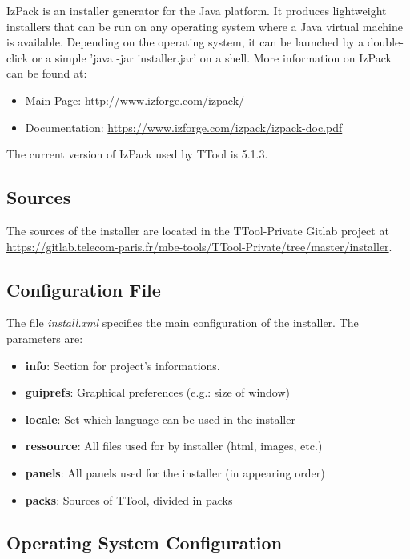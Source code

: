 \documentclass[12pt]{article}
\begin{document}
IzPack is an installer generator for the Java platform. It produces lightweight
installers that can be run on any operating system where a Java virtual machine
is available. Depending on the operating system, it can be launched by a
double-click or a simple 'java -jar installer.jar' on a shell. More information on IzPack can be found at:

\begin{itemize}
\item Main Page: \url{http://www.izforge.com/izpack/}
\item Documentation: \url{https://www.izforge.com/izpack/izpack-doc.pdf}
\end{itemize}

The current version of IzPack used by TTool is 5.1.3.

\subsection{Sources}

The sources of the installer are located in the TTool-Private Gitlab project at \url{https://gitlab.telecom-paris.fr/mbe-tools/TTool-Private/tree/master/installer}. 

\subsection{Configuration File}

The file \emph{install.xml} specifies the main configuration of the installer. The parameters are:

\begin{itemize}
	\item \textbf{info}: Section for project's informations.
	\item \textbf{guiprefs}: Graphical preferences (e.g.: size of window)
	\item \textbf{locale}: Set which language can be used in the installer
	\item \textbf{ressource}: All files used for by installer (html, images, etc.)
	\item \textbf{panels}: All panels used for the installer (in appearing order)
	\item \textbf{packs}: Sources of TTool, divided in packs
\end{itemize}

\subsection{Operating System Configuration}
\end{document}
